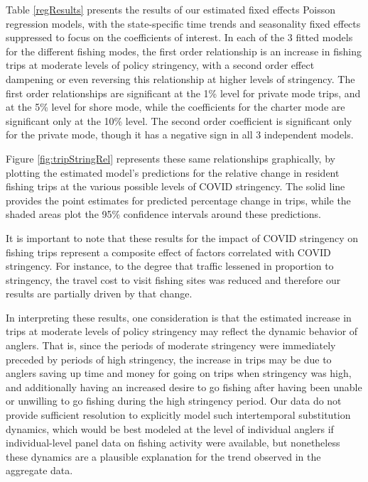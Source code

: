 \documentclass[12pt]{article}
\begin{document}
Table \ref{regResults} presents the results of our estimated fixed
effects Poisson regression models, with the state-specific time trends
and seasonality fixed effects suppressed to focus on the coefficients of
interest. In each of the 3 fitted models for the different fishing
modes, the first order relationship is an increase in fishing trips at
moderate levels of policy stringency, with a second order effect
dampening or even reversing this relationship at higher levels of
stringency. The first order relationships are significant at the 1\%
level for private mode trips, and at the 5\% level for shore mode, while
the coefficients for the charter mode are significant only at the 10\%
level. The second order coefficient is significant only for the private
mode, though it has a negative sign in all 3 independent models.

Figure \ref{fig:tripStringRel} represents these same relationships
graphically, by plotting the estimated model's predictions for the
relative change in resident fishing trips at the various possible levels
of COVID stringency. The solid line provides the point estimates for
predicted percentage change in trips, while the shaded areas plot the
95\% confidence intervals around these predictions.

It is important to note that these results for the impact of COVID
stringency on fishing trips represent a composite effect of factors
correlated with COVID stringency. For instance, to the degree that
traffic lessened in proportion to stringency, the travel cost to visit
fishing sites was reduced and therefore our results are partially driven
by that change.

In interpreting these results, one consideration is that the estimated
increase in trips at moderate levels of policy stringency may reflect
the dynamic behavior of anglers. That is, since the periods of moderate
stringency were immediately preceded by periods of high stringency, the
increase in trips may be due to anglers saving up time and money for
going on trips when stringency was high, and additionally having an
increased desire to go fishing after having been unable or unwilling to
go fishing during the high stringency period. Our data do not provide
sufficient resolution to explicitly model such intertemporal
substitution dynamics, which would be best modeled at the level of
individual anglers if individual-level panel data on fishing activity
were available, but nonetheless these dynamics are a plausible
explanation for the trend observed in the aggregate data.
\end{document}
